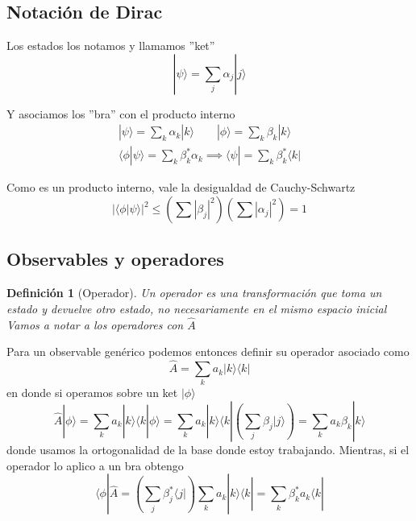 \documentclass{book}
\numberwithin{equation}{section} %
\newtheorem{definition}{Definición}[chapter]
\begin{document}
\subsection{Notación de Dirac}

Los estados los notamos y llamamos ''ket''
\begin{equation}
    |\psi\rangle = \sum_j \alpha_j |j\rangle
\end{equation}

Y asociamos los ''bra'' con el producto interno
\begin{equation}
    \begin{gathered}
    |\psi\rangle = \sum_k \alpha_k |k \rangle \qquad |\phi\rangle = \sum_k \beta_k |k\rangle \\
    \langle \phi | \psi \rangle = \sum_k \beta^*_k \alpha_k \implies \langle \psi | = \sum_k \beta^*_k \langle k|
\end{gathered}
\end{equation}

Como es un producto interno, vale la desigualdad de Cauchy-Schwartz
\begin{equation}
    |\langle \phi | \psi \rangle|^2 \leq (\sum |\beta_j|^2) (\sum |\alpha_j|^2) = 1
\end{equation}

\subsection{Observables y operadores}

\begin{definition}[Operador]
    Un operador es una transformación que toma un estado y devuelve otro estado, no necesariamente en el mismo espacio inicial
    Vamos a notar a los operadores con $\hat{A}$
\end{definition}

Para un observable genérico podemos entonces definir su operador asociado como
\begin{equation}
    \hat{A} = \sum_k a_k |k \rangle\langle k|
\end{equation}
en donde si operamos sobre un ket $|\phi \rangle$
\begin{equation}
    \hat{A} |\phi\rangle = \sum_k a_k |k \rangle \langle k | \phi \rangle = \sum_k a_k |k \rangle \langle k | \left(\sum_j \beta_j |j \rangle\right) = \sum_k a_k \beta_k |k \rangle
\end{equation}
donde usamos la ortogonalidad de la base donde estoy trabajando.
Mientras, si el operador lo aplico a un bra obtengo
\begin{equation}
    \langle \phi | \hat{A} = \left(\sum_j \beta^{*}_j \langle j |\right) \sum_k a_k | k \rangle \langle k | = \sum_k \beta^{*}_k a_k \langle k |
\end{equation}
\end{document}
